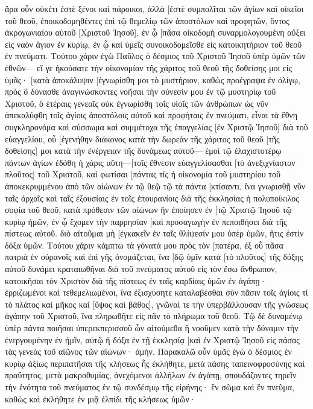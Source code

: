 ἄρα οὖν οὐκέτι ἐστὲ ξένοι καὶ πάροικοι, ἀλλὰ [ἐστὲ συμπολῖται τῶν ἁγίων καὶ οἰκεῖοι τοῦ θεοῦ, 
ἐποικοδομηθέντες ἐπὶ τῷ θεμελίῳ τῶν ἀποστόλων καὶ προφητῶν, ὄντος ἀκρογωνιαίου αὐτοῦ [Χριστοῦ Ἰησοῦ], 
ἐν ᾧ [πᾶσα οἰκοδομὴ συναρμολογουμένη αὔξει εἰς ναὸν ἅγιον ἐν κυρίῳ, 
ἐν ᾧ καὶ ὑμεῖς συνοικοδομεῖσθε εἰς κατοικητήριον τοῦ θεοῦ ἐν πνεύματι. 
Τούτου χάριν ἐγὼ Παῦλος ὁ δέσμιος τοῦ Χριστοῦ Ἰησοῦ ὑπὲρ ὑμῶν τῶν ἐθνῶν— 
εἴ γε ἠκούσατε τὴν οἰκονομίαν τῆς χάριτος τοῦ θεοῦ τῆς δοθείσης μοι εἰς ὑμᾶς· 
[κατὰ ἀποκάλυψιν [ἐγνωρίσθη μοι τὸ μυστήριον, καθὼς προέγραψα ἐν ὀλίγῳ, 
πρὸς ὃ δύνασθε ἀναγινώσκοντες νοῆσαι τὴν σύνεσίν μου ἐν τῷ μυστηρίῳ τοῦ Χριστοῦ, 
ὃ ἑτέραις γενεαῖς οὐκ ἐγνωρίσθη τοῖς υἱοῖς τῶν ἀνθρώπων ὡς νῦν ἀπεκαλύφθη τοῖς ἁγίοις ἀποστόλοις αὐτοῦ καὶ προφήταις ἐν πνεύματι, 
εἶναι τὰ ἔθνη συγκληρονόμα καὶ σύσσωμα καὶ συμμέτοχα τῆς ἐπαγγελίας [ἐν Χριστῷ Ἰησοῦ] διὰ τοῦ εὐαγγελίου, 
οὗ [ἐγενήθην διάκονος κατὰ τὴν δωρεὰν τῆς χάριτος τοῦ θεοῦ [τῆς δοθείσης] μοι κατὰ τὴν ἐνέργειαν τῆς δυνάμεως αὐτοῦ— 
ἐμοὶ τῷ ἐλαχιστοτέρῳ πάντων ἁγίων ἐδόθη ἡ χάρις αὕτη—[τοῖς ἔθνεσιν εὐαγγελίσασθαι [τὸ ἀνεξιχνίαστον πλοῦτος] τοῦ Χριστοῦ, 
καὶ φωτίσαι [πάντας τίς ἡ οἰκονομία τοῦ μυστηρίου τοῦ ἀποκεκρυμμένου ἀπὸ τῶν αἰώνων ἐν τῷ θεῷ τῷ τὰ πάντα [κτίσαντι, 
ἵνα γνωρισθῇ νῦν ταῖς ἀρχαῖς καὶ ταῖς ἐξουσίαις ἐν τοῖς ἐπουρανίοις διὰ τῆς ἐκκλησίας ἡ πολυποίκιλος σοφία τοῦ θεοῦ, 
κατὰ πρόθεσιν τῶν αἰώνων ἣν ἐποίησεν ἐν [τῷ Χριστῷ Ἰησοῦ τῷ κυρίῳ ἡμῶν, 
ἐν ᾧ ἔχομεν τὴν παρρησίαν [καὶ προσαγωγὴν ἐν πεποιθήσει διὰ τῆς πίστεως αὐτοῦ. 
διὸ αἰτοῦμαι μὴ [ἐγκακεῖν ἐν ταῖς θλίψεσίν μου ὑπὲρ ὑμῶν, ἥτις ἐστὶν δόξα ὑμῶν. 
Τούτου χάριν κάμπτω τὰ γόνατά μου πρὸς τὸν [πατέρα, 
ἐξ οὗ πᾶσα πατριὰ ἐν οὐρανοῖς καὶ ἐπὶ γῆς ὀνομάζεται, 
ἵνα [δῷ ὑμῖν κατὰ [τὸ πλοῦτος] τῆς δόξης αὐτοῦ δυνάμει κραταιωθῆναι διὰ τοῦ πνεύματος αὐτοῦ εἰς τὸν ἔσω ἄνθρωπον, 
κατοικῆσαι τὸν Χριστὸν διὰ τῆς πίστεως ἐν ταῖς καρδίαις ὑμῶν ἐν ἀγάπῃ· ἐρριζωμένοι καὶ τεθεμελιωμένοι, 
ἵνα ἐξισχύσητε καταλαβέσθαι σὺν πᾶσιν τοῖς ἁγίοις τί τὸ πλάτος καὶ μῆκος καὶ [ὕψος καὶ βάθος], 
γνῶναί τε τὴν ὑπερβάλλουσαν τῆς γνώσεως ἀγάπην τοῦ Χριστοῦ, ἵνα πληρωθῆτε εἰς πᾶν τὸ πλήρωμα τοῦ θεοῦ. 
Τῷ δὲ δυναμένῳ ὑπὲρ πάντα ποιῆσαι ὑπερεκπερισσοῦ ὧν αἰτούμεθα ἢ νοοῦμεν κατὰ τὴν δύναμιν τὴν ἐνεργουμένην ἐν ἡμῖν, 
αὐτῷ ἡ δόξα ἐν τῇ ἐκκλησίᾳ [καὶ ἐν Χριστῷ Ἰησοῦ εἰς πάσας τὰς γενεὰς τοῦ αἰῶνος τῶν αἰώνων· ἀμήν. 
Παρακαλῶ οὖν ὑμᾶς ἐγὼ ὁ δέσμιος ἐν κυρίῳ ἀξίως περιπατῆσαι τῆς κλήσεως ἧς ἐκλήθητε, 
μετὰ πάσης ταπεινοφροσύνης καὶ πραΰτητος, μετὰ μακροθυμίας, ἀνεχόμενοι ἀλλήλων ἐν ἀγάπῃ, 
σπουδάζοντες τηρεῖν τὴν ἑνότητα τοῦ πνεύματος ἐν τῷ συνδέσμῳ τῆς εἰρήνης· 
ἓν σῶμα καὶ ἓν πνεῦμα, καθὼς καὶ ἐκλήθητε ἐν μιᾷ ἐλπίδι τῆς κλήσεως ὑμῶν· 
